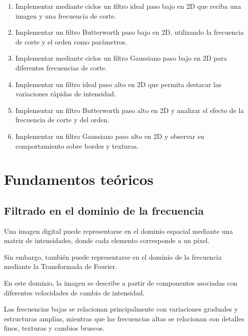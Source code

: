 \documentclass[11pt,letterpaper]{article}
\begin{document}
\begin{enumerate}

    \item Implementar mediante ciclos un filtro ideal
    paso bajo en 2D que reciba una imagen y una
    frecuencia de corte.

    \item Implementar un filtro Butterworth paso bajo
    en 2D, utilizando la frecuencia de corte y el
    orden como parámetros.

    \item Implementar mediante ciclos un filtro
    Gaussiano paso bajo en 2D para diferentes
    frecuencias de corte.

    \item Implementar un filtro ideal paso alto
    en 2D que permita destacar las variaciones
    rápidas de intensidad.

    \item Implementar un filtro Butterworth paso alto
    en 2D y analizar el efecto de la frecuencia
    de corte y del orden.

    \item Implementar un filtro Gaussiano paso alto
    en 2D y observar su comportamiento sobre
    bordes y texturas.

\end{enumerate}

\section{Fundamentos teóricos}

\subsection{Filtrado en el dominio de la frecuencia}

Una imagen digital puede representarse en el dominio
espacial mediante una matriz de intensidades, donde
cada elemento corresponde a un píxel.

Sin embargo, también puede representarse en el
dominio de la frecuencia mediante la Transformada
de Fourier.

En este dominio, la imagen se describe a partir
de componentes asociadas con diferentes velocidades
de cambio de intensidad.

Las frecuencias bajas se relacionan principalmente
con variaciones graduales y estructuras amplias,
mientras que las frecuencias altas se relacionan
con detalles finos, texturas y cambios bruscos.
\end{document}
